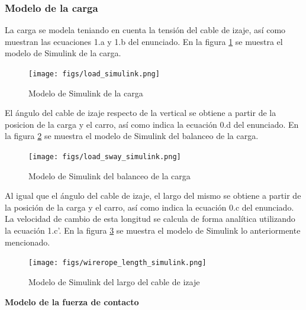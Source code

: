 \documentclass{article}
\begin{document}
            \subsubsection{Modelo de la carga}
                
                La carga se modela teniando en cuenta la tensión del cable de izaje, así como muestran las ecuaciones 1.a y 1.b del enunciado. En la figura \ref{fig:load_simulink} se muestra el modelo de Simulink de la carga.
    
                \begin{figure} [H]
                    \centering
                    \texttt{[image: figs/load\_simulink.png]}
                    \caption{Modelo de Simulink de la carga}
                    \label{fig:load_simulink}
                \end{figure}
    
                El ángulo del cable de izaje respecto de la vertical se obtiene a partir de la posicion de la carga y el carro, así como indica la ecuación 0.d del enunciado. En la figura \ref{fig:load_sway_simulink} se muestra el modelo de Simulink del balanceo de la carga.
    
                \begin{figure} [H]
                    \centering
                    \texttt{[image: figs/load\_sway\_simulink.png]}
                    \caption{Modelo de Simulink del balanceo de la carga}
                    \label{fig:load_sway_simulink}
                \end{figure}
    
                Al igual que el ángulo del cable de izaje, el largo del mismo se obtiene a partir de la posición de la carga y el carro, así como indica la ecuación 0.c del enunciado. La velocidad de cambio de esta longitud se calcula de forma analítica utilizando la ecuación 1.c'. En la figura \ref{fig:wirerope_length_simulink} se muestra el modelo de Simulink lo anteriormente mencionado.
    
                \begin{figure} [H]
                    \centering
                    \texttt{[image: figs/wirerope\_length\_simulink.png]}
                    \caption{Modelo de Simulink del largo del cable de izaje}
                    \label{fig:wirerope_length_simulink}
                \end{figure}
    
                \textbf{Modelo de la fuerza de contacto}
    
\end{document}
